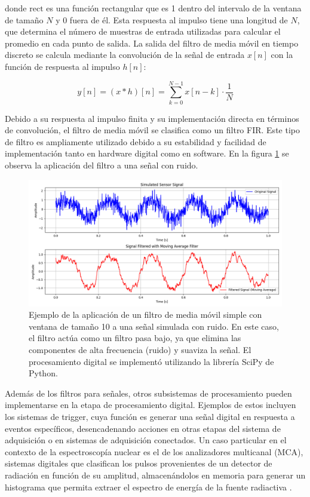 \documentclass[]{book}
\begin{document}
\noindent donde \( \text{rect} \) es una función rectangular que es 1 dentro del intervalo de la ventana de tamaño \( N \) y 0 fuera de él. Esta respuesta al impulso tiene una longitud de \( N \), que determina el número de muestras de entrada utilizadas para calcular el promedio en cada punto de salida. La salida del filtro de media móvil en tiempo discreto se calcula mediante la convolución de la señal de entrada \( x[n] \) con la función de respuesta al impulso \( h[n] \):

\begin{equation}
    y[n] = (x * h)[n] = \sum_{k=0}^{N-1} x[n-k] \cdot \frac{1}{N}
\end{equation}

\noindent Debido a su respuesta al impulso finita y su implementación directa en términos de convolución, el filtro de media móvil se clasifica como un filtro FIR. Este tipo de filtro es ampliamente utilizado debido a su estabilidad y facilidad de implementación tanto en hardware digital como en software. En la figura \ref{fig:SMA}
se observa la aplicación del filtro a una señal con ruido.
\begin{figure}[h]
    \centering
    \includegraphics[width=1.0\textwidth]{SMA.png}
    \caption{Ejemplo de la aplicación de un filtro de media móvil simple con ventana de tamaño 10 a una señal simulada con ruido. En este caso, el filtro actúa como un filtro pasa bajo, ya que elimina las componentes de alta frecuencia (ruido) y suaviza la señal. El procesamiento digital se implementó utilizando la librería SciPy de Python.}
    \label{fig:SMA}

\end{figure}

\noindent Además de los filtros para señales, otros subsistemas de procesamiento pueden implementarse en la etapa de procesamiento digital. Ejemplos de estos incluyen los sistemas de trigger, cuya función es generar una señal digital en respuesta a eventos específicos, desencadenando acciones en otras etapas del sistema de adquisición o en sistemas de adquisición conectados. Un caso particular en el contexto de la espectroscopía nuclear es el de los analizadores multicanal (MCA), sistemas digitales que clasifican los pulsos provenientes de un detector de radiación en función de su amplitud, almacenándolos en memoria para generar un histograma que permita extraer el espectro de energía de la fuente radiactiva \cite{knoll2010radiation}.\\
\end{document}
